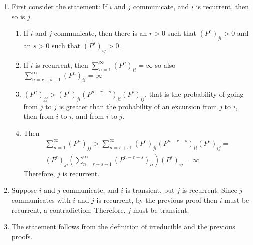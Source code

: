 \documentclass[12pt]{article}
\begin{document}
\begin{solution}
    \begin{enumerate}
        \item
            First consider the statement:  If \( i \) and \( j \)
            communicate, and \( i \) is recurrent, then so is \( j \).
            \begin{enumerate}
                \item
                    If \( i \) and \( j \) communicate, then there is an
                    \( r > 0 \) such that \( (P^r)_{ji} > 0 \) and an \(
                    s > 0 \) such that \( (P^s)_{ij} > 0 \).
                \item
                    If \( i \) is recurrent, then \( \sum_{n=1}^{\infty}
                    (P^n)_{ii} = \infty \) so also \( \sum_{n=r + s + 1}^
                    {\infty} (P^n)_{ii} = \infty \)
                \item
                    \( ( P^n)_{jj} > (P^r)_{ji}(P^{n-r-s})_{ii}(P^s)_{ij}
                    \), that is the probability of going from \( j \) to
                    \( j \) is greater than the probability of an
                    excursion from \( j \) to \( i \), then from \( i \)
                    to \( i \), and from \( i \) to \( j \).
                \item
                  Then
                  \begin{multline*}
                     \sum_{n=1}^{\infty}(P^n)_{jj} > \sum_{n=r+s1}^{\infty}
                     (P^r)_{ji}(P^{n-r-s})_{ii}(P^s)_{ij} = \\
                     (P^r)_{ji}\left(\sum_{n=r+s+1}^{\infty}(P^{n-r-s})_{ii}\right)(P^s)_{ij}
                     = \infty
                  \end{multline*}
                    Therefore, \( j \) is recurrent.
            \end{enumerate}
        \item
            Suppose \( i \) and \( j \) communicate, and \( i \) is
            transient, but \( j \) is recurrent.  Since \( j \)
            communicates with \( i \) and \( j \) is recurrent, by the
            previous proof then \( i \) must be recurrent, a
            contradiction. Therefore, \( j \) must be transient.
        \item
            The statement follows from the definition of irreducible and
            the previous proofs.
    \end{enumerate}
\end{solution}
\end{document}
